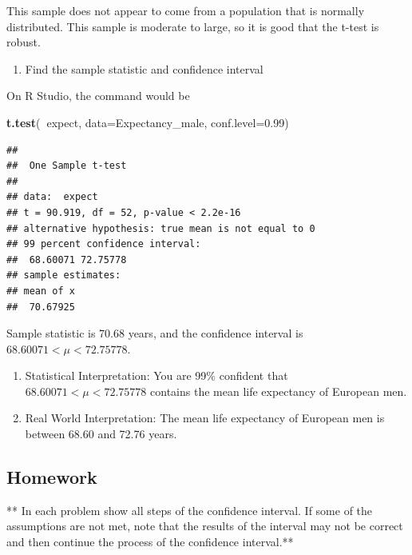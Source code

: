 \documentclass[
]{book}
\newenvironment{Shaded}{\begin{snugshade}}{\end{snugshade}}
\newcommand{\DataTypeTok}[1]{\textcolor[rgb]{0.13,0.29,0.53}{#1}}
\newcommand{\FloatTok}[1]{\textcolor[rgb]{0.00,0.00,0.81}{#1}}
\newcommand{\KeywordTok}[1]{\textcolor[rgb]{0.13,0.29,0.53}{\textbf{#1}}}
\newcommand{\NormalTok}[1]{#1}
\newcommand{\OperatorTok}[1]{\textcolor[rgb]{0.81,0.36,0.00}{\textbf{#1}}}
\providecommand{\tightlist}{%
  \setlength{\itemsep}{0pt}\setlength{\parskip}{0pt}}
\begin{document}
This sample does not appear to come from a population that is normally distributed. This sample is moderate to large, so it is good that the t-test is robust.

\begin{enumerate}
\def\labelenumi{\arabic{enumi}.}
\setcounter{enumi}{2}
\tightlist
\item
  Find the sample statistic and confidence interval
\end{enumerate}

On R Studio, the command would be

\begin{Shaded}
\begin{Highlighting}[]
\KeywordTok{t.test}\NormalTok{(}\OperatorTok{~}\NormalTok{expect, }\DataTypeTok{data=}\NormalTok{Expectancy_male, }\DataTypeTok{conf.level=}\FloatTok{0.99}\NormalTok{)}
\end{Highlighting}
\end{Shaded}

\begin{verbatim}
## 
##  One Sample t-test
## 
## data:  expect
## t = 90.919, df = 52, p-value < 2.2e-16
## alternative hypothesis: true mean is not equal to 0
## 99 percent confidence interval:
##  68.60071 72.75778
## sample estimates:
## mean of x 
##  70.67925
\end{verbatim}

Sample statistic is 70.68 years, and the confidence interval is \(68.60071<\mu<72.75778\).

\begin{enumerate}
\def\labelenumi{\arabic{enumi}.}
\setcounter{enumi}{3}
\item
  Statistical Interpretation: You are 99\% confident that \(68.60071<\mu<72.75778\) contains the mean life expectancy of European men.
\item
  Real World Interpretation: The mean life expectancy of European men is between 68.60 and 72.76 years.
\end{enumerate}

\hypertarget{homework-21}{%
\subsection{Homework}\label{homework-21}}

** In each problem show all steps of the confidence interval. If some of the assumptions are not met, note that the results of the interval may not be correct and then continue the process of the confidence interval.**
\end{document}
